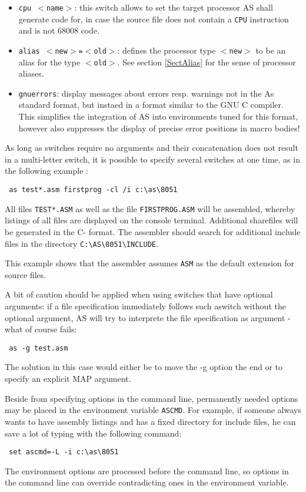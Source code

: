 \documentclass[12pt,twoside]{report}
\newcommand{\tty}[1]{{\tt #1}}
\begin{document}
\begin{itemize}
{      the first pass.  Be prepared for a bunch of messages!!}
\item{\tty{cpu $<$name$>$}: this switch allows to set the target processor
      AS shall generate code for, in case the source file does not contain 
      a {\tt CPU} instruction and is not 68008 code.}
\item{\tty{alias $<$new$>$=$<$old$>$}:
      defines the processor type \tty{$<$new$>$} to be an alias for the
      type \tty{$<$old$>$}.  See section \ref{SectAlias} for the sense of
      processor aliases.}
\item{{\tt gnuerrors}: display messages about errors resp. warnings not
      in the As standard format, but instaed in a format similar to the
      GNU C compiler.  This simplifies the integration of AS into 
      environments tuned for this format, however also suppresses the
      display of precise error positions in macro bodies!}
\end{itemize}
As long as switches require no arguments and their concatenation does
not result in a multi-letter switch, it is possible to specify several 
switches at one time, as in the following example :
\begin{verbatim}
 as test*.asm firstprog -cl /i c:\as\8051
\end{verbatim}
All files \tty{TEST*.ASM} as well as the file \tty{FIRSTPROG.ASM} will be 
assembled, whereby listings of all files are displayed on the 
console terminal.  Additional sharefiles will be generated in the C-
format.  The assembler should search for additional include files 
in the directory \verb!C:\AS\8051\INCLUDE!.

This example shows that the assembler assumes \tty{ASM} as the default 
extension for source files.

A bit of caution should be applied when using switches that have
optional arguments: if a file specification immediately follows such 
aswitch without the optional argument, AS will try to interprete the
file specification as argument - what of course fails:
\begin{verbatim}
 as -g test.asm
\end{verbatim}
The solution in this case would either be to move the -g option the  
end or to specify an explicit MAP argument.


Beside from specifying options in the command line, permanently
needed options may be placed in the environment variable \tty{ASCMD}.  For
example, if someone always wants to have assembly listings and has a
fixed directory for include files, he can save a lot of typing with
the following command:
\begin{verbatim}
 set ascmd=-L -i c:\as\8051
\end{verbatim}
The environment options are processed before the command line,
so options in the command line can override contradicting ones in the
environment variable.
\end{document}
